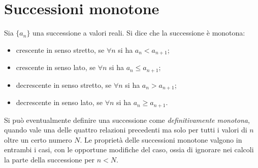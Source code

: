 \section{Successioni monotone}
Sia $\{a_n\}$ una successione a valori reali. Si dice che la successione è monotona:
\begin{itemize}
\item crescente in senso stretto, se $\forall n$ si ha $a_n<a_{n+1}$;
\item crescente in senso lato, se $\forall n$ si ha $a_n\leq a_{n+1}$;
\item decrescente in senso stretto, se $\forall n$ si ha $a_n>a_{n+1}$;
\item decrescente in senso lato, se $\forall n$ si ha $a_n\geq a_{n+1}$.
\end{itemize}
Si può eventualmente definire una successione come \emph{definitivamente monotona}, quando vale una delle quattro relazioni precedenti ma solo per tutti i valori di $n$ oltre un certo numero $N$. Le proprietà delle successioni monotone valgono in entrambi i casi, con le opportune modifiche del caso, ossia di ignorare nei calcoli la parte della successione per $n<N$.

